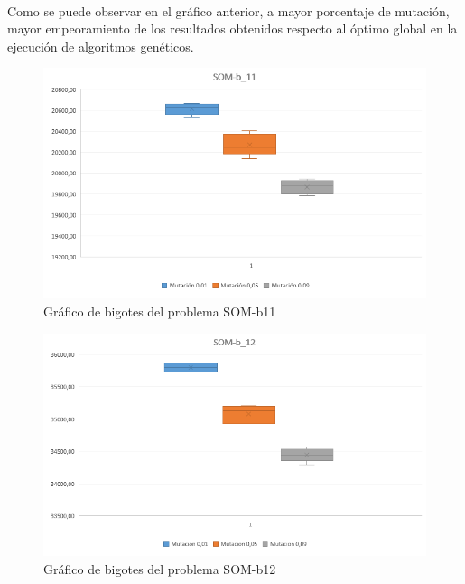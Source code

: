 	\paragraph{}Como se puede observar en el gráfico anterior, a mayor porcentaje de mutación, mayor empeoramiento de los resultados obtenidos respecto al óptimo global en la ejecución de algoritmos genéticos.

	\begin{figure}[H]
		
		\centering
		\includegraphics[scale=0.65]{img/BigotesMutacionSOM_11}
		\caption{Gráfico de bigotes del problema SOM-b11}
		
	\end{figure}

	\begin{figure}[H]
		
		\centering
		\includegraphics[scale=0.65]{img/BigotesMutacionSOM_12}
		\caption{Gráfico de bigotes del problema SOM-b12}
		
	\end{figure}

